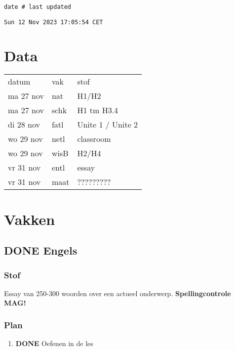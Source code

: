 \documentclass[11pt]{article}
\date{\today}
\title{}
\begin{document}
\setcounter{tocdepth}{3}
\tableofcontents

\begin{verbatim}
date # last updated
\end{verbatim}

\begin{verbatim}
Sun 12 Nov 2023 17:05:54 CET
\end{verbatim}

\section{Data}
\label{sec:org81b92f1}
\begin{center}
\begin{tabular}{lll}
datum & vak & stof\\[0pt]
ma 27 nov & nat & H1/H2\\[0pt]
ma 27 nov & schk & H1 tm H3.4\\[0pt]
di 28 nov & fatl & Unite 1 / Unite 2\\[0pt]
wo 29 nov & netl & classroom\\[0pt]
wo 29 nov & wisB & H2/H4\\[0pt]
vr 31 nov & entl & essay\\[0pt]
vr 31 nov & maat & ?????????\\[0pt]
\end{tabular}
\end{center}

\section{Vakken}
\label{sec:orgb4649f0}
\subsection{{\bfseries\sffamily DONE} Engels}
\label{sec:orga552bf0}
\subsubsection{Stof}
\label{sec:org5fa5dca}
Essay van 250-300 woorden over een actueel onderwerp. \textbf{Spellingcontrole MAG!}
\subsubsection{Plan}
\label{sec:orgf9f89c7}
\begin{enumerate}
\item {\bfseries\sffamily DONE} Oefenen in de les
\label{sec:org2f65b30}
\end{enumerate}
\end{document}
